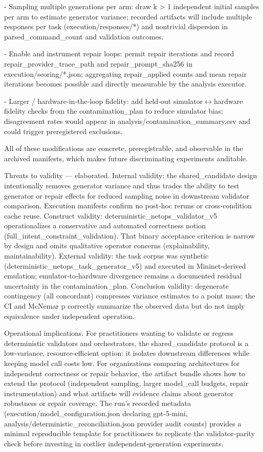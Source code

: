 \documentclass[conference]{IEEEtran}
\begin{document}
- Sampling multiple generations per arm: draw k > 1 independent initial samples per arm to estimate generator variance; recorded artifacts will include multiple responses per task (execution/responses/*) and nontrivial dispersion in parsed\_command\_count and validation outcomes.

- Enable and instrument repair loops: permit repair iterations and record repair\_provider\_trace\_path and repair\_prompt\_sha256 in execution/scoring/*.json; aggregating repair\_applied counts and mean repair iterations becomes possible and directly measurable by the analysis executor.

- Larger / hardware‑in‑the‑loop fidelity: add held‑out simulator\ensuremath{\leftrightarrow}hardware fidelity checks from the contamination\_plan to reduce simulator bias; disagreement rates would appear in analysis/contamination\_summary.csv and could trigger preregistered exclusions.

All of these modifications are concrete, preregistrable, and observable in the archived manifests, which makes future discriminating experiments auditable.

Threats to validity --- elaborated. Internal validity: the shared\_candidate design intentionally removes generator variance and thus trades the ability to test generator or repair effects for reduced sampling noise in downstream validator comparison. Execution manifests confirm no post‑hoc reruns or cross‑condition cache reuse. Construct validity: deterministic\_netops\_validator\_v5 operationalizes a conservative and automated correctness notion (full\_intent\_constraint\_validation). That binary acceptance criterion is narrow by design and omits qualitative operator concerns (explainability, maintainability). External validity: the task corpus was synthetic (deterministic\_netops\_task\_generator\_v5) and executed in Mininet‑derived emulation; emulator‑to‑hardware divergence remains a documented residual uncertainty in the contamination\_plan. Conclusion validity: degenerate contingency (all concordant) compresses variance estimates to a point mass; the CI and McNemar p correctly summarize the observed data but do not imply equivalence under independent operation.

Operational implications. For practitioners wanting to validate or regress deterministic validators and orchestrators, the shared\_candidate protocol is a low‑variance, resource‑efficient option: it isolates downstream differences while keeping model call costs low. For organizations comparing architectures for independent correctness or repair behavior, the artifact bundle shows how to extend the protocol (independent sampling, larger model\_call budgets, repair instrumentation) and what artifacts will evidence claims about generator robustness or repair coverage. The run's recorded metadata (execution/model\_configuration.json declaring gpt‑5‑mini, analysis/deterministic\_reconciliation.json provider audit counts) provides a minimal reproducible template for practitioners to replicate the validator‑parity check before investing in costlier independent‑generation experiments.
\end{document}

